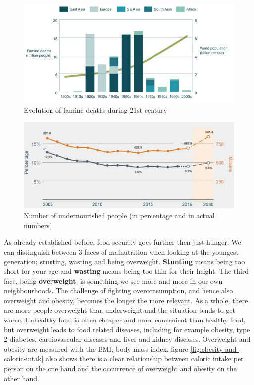 \documentclass[../summary.tex]{subfiles}
\begin{document}
	\begin{figure} [htbp]
		\centering
		\includegraphics[width=1\linewidth]{images/6-famine.png}
		\caption{Evolution of famine deaths during 21st century}
		\label{fig:famine}
	\end{figure}
	
	\begin{figure} [htbp]
		\centering
		\includegraphics[width=1\linewidth]{images/6-undernourishment.png}
		\caption{Number of undernourished people (in percentage and in actual numbers)}
		\label{fig:undernourishment}
	\end{figure}
	
	As already established before, food security goes further then just hunger. We can distinguish between 3 faces of malnutrition when looking at the youngest generation: stunting, wasting and being overweight.
	\textbf{Stunting} means being too short for your age and \textbf{wasting} means being too thin for their height. The third face, being \textbf{overweight}, is something we see more and more in our own neighbourhoods. The challenge of fighting overconsumption, and hence also overweight and obesity, becomes the longer the more relevant. As a whole, there are more people overweight than underweight and the situation tends to get worse. Unhealthy food is often cheaper and more convenient than healthy food, but overweight leads to food related diseases, including for example obesity, type 2 diabetes, cardiovascular diseases and liver and kidney diseases. Overweight and obesity are measured with the BMI, body mass index. figure \ref{fig:obesity-and-caloric-intak} also shows there is a clear relationship between caloric intake per person on the one hand and the occurrence of overweight and obesity on the other hand.
	
\end{document}
